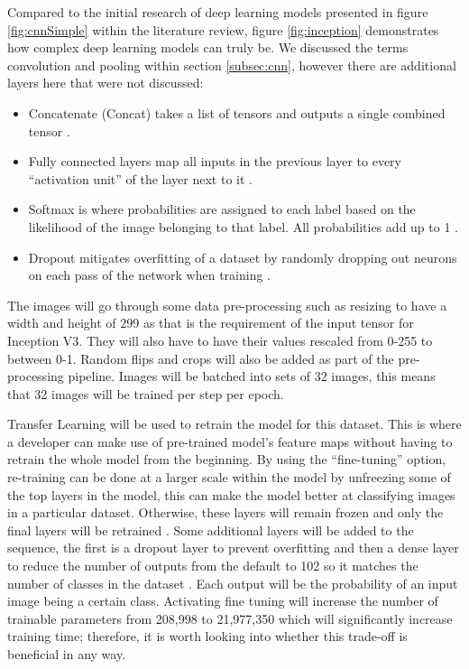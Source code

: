 \documentclass[12pt,a4paper]{report}
\begin{document}
Compared to the initial research of deep learning models presented in figure \ref{fig:cnnSimple} within the literature 
review, figure \ref{fig:inception} demonstrates how complex deep learning models can truly be. 
We discussed the terms convolution and pooling within section \ref{subsec:cnn}, however there are additional layers here that were 
not discussed:

\begin{itemize}
    \item Concatenate (Concat) takes a list of tensors and outputs a single combined tensor \citep{kerasconcat}.
    \item Fully connected layers map all inputs in the previous layer to every “activation unit” of the layer next to it
\citep{singhsurya}.
    \item Softmax is where probabilities are assigned to each label based on the likelihood of the image belonging to 
that label. All probabilities add up to 1 \citep{googledevcnn}. 
    \item Dropout mitigates overfitting of a dataset by randomly dropping out neurons on each pass of the network when 
    training \citep{seb}. 
\end{itemize}

The images will go through some data pre-processing such as resizing to have a width and height of 299 as that is the 
requirement of the input tensor for Inception V3. They will also have to have their values rescaled from 0-255 to 
between 0-1. Random flips and crops will also be added as part of the pre-processing pipeline. Images will be batched 
into sets of 32 images, this means that 32 images will be trained per step per epoch. 

\par

Transfer Learning will be used to retrain the model for this dataset. This is where a developer can make use of 
pre-trained model's feature maps without having to retrain the whole model from the beginning. By using the 
“fine-tuning” option, re-training can be done at a larger scale within the model by unfreezing some of the top layers in
the model, this can make the model better at classifying images in a particular dataset. Otherwise, these layers will 
remain frozen and only the final layers will be retrained \citep{transfer}. Some additional layers will be added to the 
sequence, the 
first is a dropout layer to prevent overfitting and then a dense layer to reduce the number of outputs from the default 
to 102 so it matches the number of classes in the dataset \citep{denselayer}. Each output will be the probability of an 
input image being a
certain class. Activating fine tuning will increase the number of trainable parameters from 208,998 to 21,977,350 which 
will significantly increase training time; therefore, it is worth looking into whether this trade-off is beneficial in 
any way.
\end{document}
